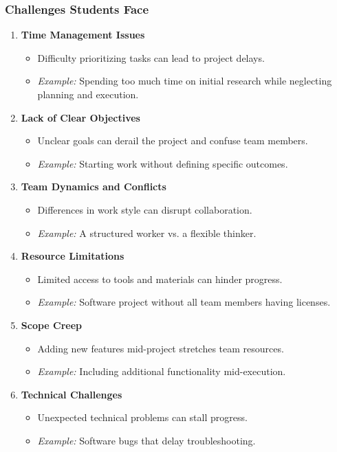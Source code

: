 \documentclass[aspectratio=169]{beamer}
\begin{document}
\begin{frame}[fragile]
  \frametitle{Challenges Students Face}
  \begin{enumerate}
    \item \textbf{Time Management Issues} 
      \begin{itemize}
        \item Difficulty prioritizing tasks can lead to project delays.
        \item \textit{Example:} Spending too much time on initial research while neglecting planning and execution.
      \end{itemize}
    
    \item \textbf{Lack of Clear Objectives}
      \begin{itemize}
        \item Unclear goals can derail the project and confuse team members.
        \item \textit{Example:} Starting work without defining specific outcomes.
      \end{itemize}
    
    \item \textbf{Team Dynamics and Conflicts}
      \begin{itemize}
        \item Differences in work style can disrupt collaboration.
        \item \textit{Example:} A structured worker vs. a flexible thinker.
      \end{itemize}
    
    \item \textbf{Resource Limitations}
      \begin{itemize}
        \item Limited access to tools and materials can hinder progress.
        \item \textit{Example:} Software project without all team members having licenses.
      \end{itemize}
    
    \item \textbf{Scope Creep}
      \begin{itemize}
        \item Adding new features mid-project stretches team resources.
        \item \textit{Example:} Including additional functionality mid-execution.
      \end{itemize}
    
    \item \textbf{Technical Challenges}
      \begin{itemize}
        \item Unexpected technical problems can stall progress.
        \item \textit{Example:} Software bugs that delay troubleshooting.
      \end{itemize}
  \end{enumerate}
\end{frame}
\end{document}
